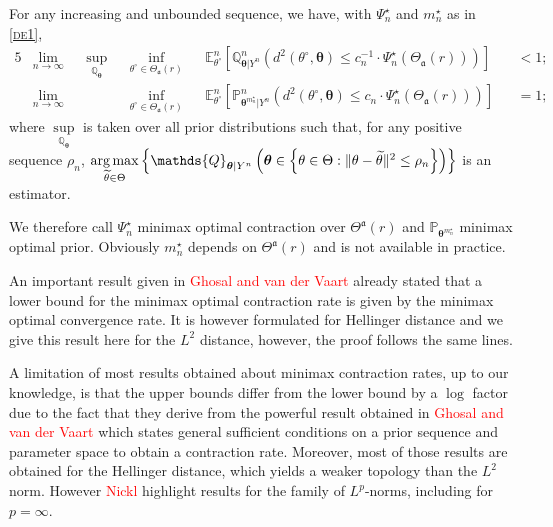 \begin{thm}\label{thm2}
For any increasing and unbounded sequence, we have,  with $\Psi_{n}^{\star}$ and $m_{n}^{\star}$ as in \textsc{\cref{de1}},
\begin{alignat*}{5}
& \lim_{n \rightarrow \infty} && \sup\limits_{\mathds{Q}_{\boldsymbol{\theta}}} && \inf\limits_{\theta^{\circ} \in \Theta_{\mathfrak{a}}(r)} && \mathds{E}_{\theta^{\circ}}^{n}\left[\mathds{Q}_{\boldsymbol{\theta}\vert Y^{n}}^{n}\left(d^{2}\left(\theta^{\circ}, \boldsymbol{\theta}\right) \leq c_{n}^{-1} \cdot \Psi_{n}^{\star}(\Theta_{\mathfrak{a}}(r)) \right)\right]&& < 1;\\
& \lim_{n \rightarrow \infty}&& && \inf\limits_{\theta^{\circ} \in \Theta_{\mathfrak{a}}(r)} && \mathds{E}_{\theta^{\circ}}^{n}\left[\mathds{P}_{\boldsymbol{\theta}^{m_{n}^{\star}}\vert Y^{n}}^{n}\left(d^{2}\left(\theta^{\circ}, \boldsymbol{\theta}\right) \leq c_{n} \cdot \Psi^{\star}_{n}(\Theta_{\mathfrak{a}}(r)) \right)\right]&& = 1;
\end{alignat*}
where $\sup\limits_{\mathds{Q}_{\boldsymbol{\theta}}}$ is taken over all prior distributions such that, for any positive sequence $\rho_{n}$, $\argmax\limits_{\widetilde{\theta} \in \Theta}\left\{\mathds{Q}_{\boldsymbol{\theta} \vert Y^{n}} \left(\boldsymbol{\theta} \in \left\{ \theta \in \Theta : \Vert \theta - \widetilde{\theta} \Vert^{2} \leq \rho_{n}\right\}\right)\right\}$ is an estimator.
\end{thm}

We therefore call $\Psi_{n}^{\star}$ minimax optimal contraction over $\Theta^{\mathfrak{a}}(r)$ and $\mathds{P}_{\boldsymbol{\theta}^{m_{n}^{\star}}}$ minimax optimal prior.
Obviously $m_{n}^{\star}$ depends on $\Theta^{\mathfrak{a}}(r)$ and is not available in practice.

An important result given in \textcolor{red}{Ghosal and van der Vaart} already stated that a lower bound for the minimax optimal contraction rate is given by the minimax optimal convergence rate. It is however formulated for Hellinger distance and we give this result here for the $L^{2}$ distance, however, the proof follows the same lines.

A limitation of most results obtained about minimax contraction rates, up to our knowledge, is that the upper bounds differ from the lower bound by a $\log$ factor due to the fact that they derive from the powerful result obtained in \textcolor{red}{Ghosal and van der Vaart} which states general sufficient conditions on a prior sequence and parameter space to obtain a contraction rate.
Moreover, most of those results are obtained for the Hellinger distance, which yields a weaker topology than the $L^{2}$ norm.
However \textcolor{red}{Nickl} highlight results for the family of $L^{p}$-norms, including for $p = \infty$.


